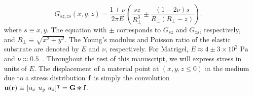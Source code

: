 \documentclass[aps,prl,reprint,groupedaddress,twocolumn]{revtex4-1}
\def\dd{\mbox{d}}
\def\f{{\bf f}}
\def\r{{\bf r}}
\def\u{{\bf u}}
\def\F{{\bf F}}
\def\F{{\bf F}}
\newcommand{\Conv}{\mathop{\scalebox{1.5}{\raisebox{-0.2ex}{$\ast$}}}}%
\begin{document}
\begin{equation}
G_{sz, zs}(x,y,z) =
\frac{1+\nu}{2\pi E}\left(\frac{sz}{R_{\perp}^{3}}\pm\frac{(1-2\nu)s}{R_{\perp}
(R_{\perp}-z)}\right).
\end{equation}
%
where $s\equiv x,y$. The equation with $\pm$ corresponds to $G_{sz}$
and $G_{zs}$, respectively, and $R_{\perp} \equiv \sqrt{x^{2}
  +y^{2}}$. The Young's modulus and Poisson ratio of the elastic
substrate are denoted by $E$ and $\nu$, respectively.  For Matrigel,
$E\approx4\pm3\times10^2\textrm{ Pa}$ and
$\nu\approx0.5$~\cite{SOOFIA2009}. Throughout the rest of this
manuscript, we will express stress in units of $E$.  The displacement
of a material point at $(x,y,z\leq 0)$ in the medium due to a stress
distribution ${\bf f}$ is simply the convolution $\u(\r) \equiv [u_x
  \ u_y\ u_z]^\intercal = {\bf G}\Conv\f$.
%

%
%
%
% 
% 
\end{document}
